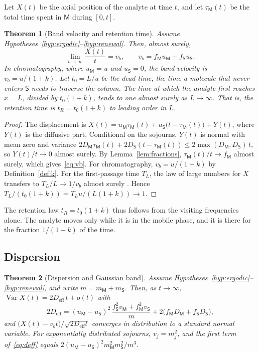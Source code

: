 \documentclass[11pt,a4paper]{article}
\newtheorem{theorem}{Theorem}[section]
\theoremstyle{definition}
\theoremstyle{remark}
\newcommand{\Var}{\operatorname{Var}}
\newcommand{\Mob}{\mathsf{M}}
\newcommand{\Sta}{\mathsf{S}}
\begin{document}
Let $X(t)$ be the axial position of the analyte at time $t$, and let $\tau_\Mob(t)$ be the total time spent in $\Mob$ during $[0,t]$.

\begin{theorem}[Band velocity and retention time]
\label{thm:retention}
Assume Hypotheses~\ref{hyp:ergodic}--\ref{hyp:renewal}.
Then, almost surely,
\begin{equation}
\lim_{t\to\infty}\frac{X(t)}{t}=v_b,\qquad v_b=f_\Mob u_\Mob+f_\Sta u_\Sta.
\label{eq:vb}
\end{equation}
In chromatography, where $u_\Mob=u$ and $u_\Sta=0$, the \emph{band velocity} is $v_b=u/(1+k)$.
Let $t_0=L/u$ be the \emph{dead time}, the time a molecule that never enters $\Sta$ needs to traverse the column.
The time at which the analyte first reaches $x=L$, divided by $t_0(1+k)$, tends to one almost surely as $L\to\infty$.
That is, the \emph{retention time} is $t_R=t_0(1+k)$ to leading order in $L$.
\end{theorem}

\begin{proof}
The displacement is $X(t)=u_\Mob\tau_\Mob(t)+u_\Sta\bigl(t-\tau_\Mob(t)\bigr)+Y(t)$, where $Y(t)$ is the diffusive part.
Conditional on the sojourns, $Y(t)$ is normal with mean zero and variance $2D_\Mob\tau_\Mob(t)+2D_\Sta(t-\tau_\Mob(t))\le2\max(D_\Mob,D_\Sta)\,t$, so $Y(t)/t\to0$ almost surely.
By Lemma~\ref{lem:fractions}, $\tau_\Mob(t)/t\to f_\Mob$ almost surely, which gives~\eqref{eq:vb}.
For chromatography, $v_b=u/(1+k)$ by Definition~\ref{def:k}.
For the first-passage time $T_L$, the law of large numbers for $X$ transfers to $T_L/L\to1/v_b$ almost surely \citep{gut2009}.
Hence $T_L/(t_0(1+k))=T_L u/(L(1+k))\to1$.
\end{proof}

The retention law $t_R=t_0(1+k)$ thus follows from the visiting frequencies alone.
The analyte moves only while it is in the mobile phase, and it is there for the fraction $1/(1+k)$ of the time.

\subsection{Dispersion}

\begin{theorem}[Dispersion and Gaussian band]
\label{thm:dispersion}
Assume Hypotheses~\ref{hyp:ergodic}--\ref{hyp:renewal}, and write $m=m_\Mob+m_\Sta$.
Then, as $t\to\infty$, $\Var X(t)=2D_{\mathrm{eff}}\,t+o(t)$ with
\begin{equation}
2D_{\mathrm{eff}}=(u_\Mob-u_\Sta)^{2}\,\frac{f_\Sta^{2}v_\Mob+f_\Mob^{2}v_\Sta}{m}+2\bigl(f_\Mob D_\Mob+f_\Sta D_\Sta\bigr),
\label{eq:deff}
\end{equation}
and $\bigl(X(t)-v_bt\bigr)/\sqrt{2D_{\mathrm{eff}}t}$ converges in distribution to a standard normal variable.
For exponentially distributed sojourns, $v_j=m_j^{2}$, and the first term of~\eqref{eq:deff} equals $2(u_\Mob-u_\Sta)^{2}m_\Mob^{2}m_\Sta^{2}/m^{3}$.
\end{theorem}
\end{document}
